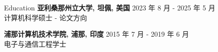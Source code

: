 \documentclass{resume} %
\begin{document}
\begin{rSection}{Education}
                        \textbf{亚利桑那州立大学, 坦佩, 美国} \hfill {2023 年 8 月 - 2025 年 5 月} \\
                            {计算机科学硕士 {-} 论文方向}
                         
             
         
                        \textbf{浦那计算机技术学院, 浦那, 印度} \hfill {2015 年 7 月 - 2019 年 6 月} \\
                            {电子与通信工程学士}
                         
             
         
    \end{rSection}

\end{document}
